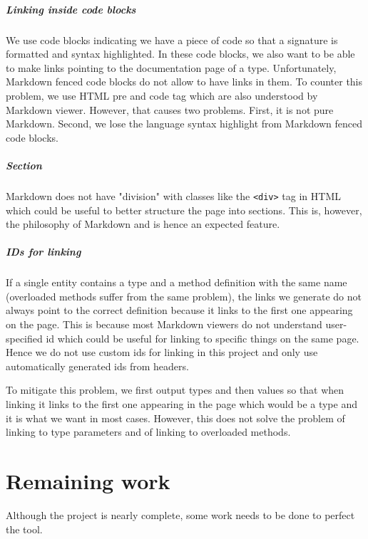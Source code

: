 \documentclass{report}
\begin{document}
\paragraph{Linking inside code blocks}
We use code blocks indicating we have a piece of code so that a signature is formatted and syntax highlighted. In these code blocks, we also want to be able to make links pointing to the documentation page of a type. Unfortunately, Markdown fenced code blocks do not allow to have links in them. To counter this problem, we use HTML pre and code tag which are also understood by Markdown viewer. However, that causes two problems. First, it is not pure Markdown. Second, we lose the language syntax highlight from Markdown fenced code blocks.

\paragraph{Section}
Markdown does not have "division" with classes like the \texttt{<div>} tag in HTML which could be useful to better structure the page into sections. This is, however, the philosophy of Markdown and is hence an expected feature.

\paragraph{IDs for linking}
If a single entity contains a type and a method definition with the same name (overloaded methods suffer from the same problem), the links we generate do not always point to the correct definition because it links to the first one appearing on the page. This is because most Markdown viewers do not understand user-specified id which could be useful for linking to specific things on the same page. Hence we do not use custom ids for linking in this project and only use automatically generated ids from headers.

To mitigate this problem, we first output types and then values so that when linking it links to the first one appearing in the page which would be a type and it is what we want in most cases. However, this does not solve the problem of linking to type parameters and of linking to overloaded methods.

\chapter{Remaining work}
Although the project is nearly complete, some work needs to be done to perfect the tool.
\end{document}
